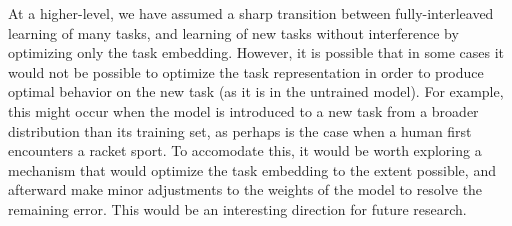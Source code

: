 At a higher-level, we have assumed a sharp transition between fully-interleaved learning of many tasks, and learning of new tasks without interference by optimizing only the task embedding. However, it is possible that in some cases it would not be possible to optimize the task representation in order to produce optimal behavior on the new task (as it is in the untrained model). For example, this might occur when the model is introduced to a new task from a broader distribution than its training set, as perhaps is the case when a human first encounters a racket sport. To accomodate this, it would be worth exploring a mechanism that would optimize the task embedding to the extent possible, and afterward make minor adjustments to the weights of the model to resolve the remaining error. This would be an interesting direction for future research.\par
